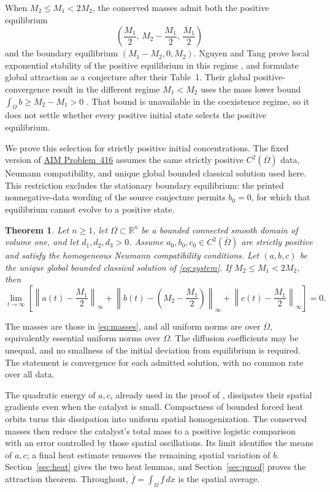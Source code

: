 \documentclass[11pt,a4paper]{article}
\newtheorem{theorem}{Theorem}[section]
\begin{document}
When \(M_2\le M_1<2M_2\), the conserved masses admit both the positive equilibrium
\[
 \left(\frac{M_1}{2},\,M_2-\frac{M_1}{2},\,\frac{M_1}{2}\right)
\]
and the boundary equilibrium \((M_1-M_2,0,M_2)\).
Nguyen and Tang prove local exponential stability of the positive
equilibrium in this regime \cite[Theorem~2.7]{NT}, and formulate global
attraction as a conjecture after their Table~1.
Their global positive-convergence result in the different regime
\(M_1<M_2\) uses the mass lower bound
\(\int_\Omega b\ge M_2-M_1>0\) \cite[Theorem~2.4]{NT}.
That bound is unavailable in the coexistence regime, so it does not
settle whether every positive initial state selects the positive equilibrium.

We prove this selection for strictly positive initial concentrations.
The fixed version of \href{https://github.com/MColbrook/AIM/blob/a153f469ee0ea64e876b2ad97c79d252c19a3e22/problems/416-catalytic-reaction-diffusion-positive-attractor.md}{AIM Problem~416}
assumes the same strictly positive \(C^2(\overline\Omega)\) data,
Neumann compatibility, and unique global bounded classical solution used here.
This restriction excludes the stationary boundary equilibrium:
the printed nonnegative-data wording of the source conjecture permits
\(b_0=0\), for which that equilibrium cannot evolve to a positive state.

\begin{theorem}\label{thm:main}
Let \(n\ge1\), let \(\Omega\subset\mathbb R^n\) be a bounded connected
smooth domain of volume one, and let \(d_1,d_2,d_3>0\).
Assume \(a_0,b_0,c_0\in C^2(\overline\Omega)\) are strictly positive
and satisfy the homogeneous Neumann compatibility conditions.
Let \((a,b,c)\) be the unique global bounded classical solution
of \eqref{eq:system}. If \(M_2\le M_1<2M_2\), then
\[
 \lim_{t\to\infty}
 \left[\left\|a(t)-\frac{M_1}{2}\right\|_\infty+
 \left\|b(t)-\left(M_2-\frac{M_1}{2}\right)\right\|_\infty+
 \left\|c(t)-\frac{M_1}{2}\right\|_\infty\right]=0.
\]
\end{theorem}
The masses are those in \eqref{eq:masses}, and all uniform norms are over
\(\overline\Omega\), equivalently essential uniform norms over \(\Omega\).
The diffusion coefficients may be unequal, and no smallness of the
initial deviation from equilibrium is required. The statement is
convergence for each admitted solution, with no common rate over all data.

The quadratic energy of \(a,c\), already used in the proof of
\cite[Theorem~2.7]{NT}, dissipates their spatial gradients even when the
catalyst is small. Compactness of bounded forced heat orbits turns this
dissipation into uniform spatial homogenization. The conserved masses
then reduce the catalyst's total mass to a positive logistic comparison
with an error controlled by those spatial oscillations.
Its limit identifies the means of \(a,c\); a final heat estimate removes
the remaining spatial variation of \(b\).
Section~\ref{sec:heat} gives the two heat lemmas, and
Section~\ref{sec:proof} proves the attraction theorem.
Throughout, \(\bar f=\int_\Omega f\,dx\) is the spatial average.
\end{document}

